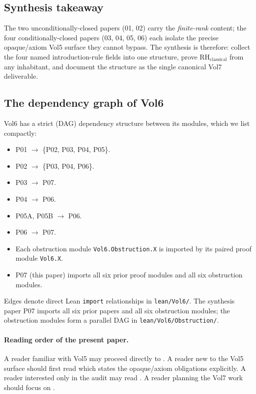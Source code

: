 \documentclass[11pt]{article}
\theoremstyle{plain}
\theoremstyle{definition}
\theoremstyle{remark}
\newcommand{\code}[1]{\texttt{#1}}
\newcommand{\RH}{\mathrm{RH}_{\mathrm{classical}}}
\begin{document}
\subsection{Synthesis takeaway}

The two unconditionally-closed papers (01, 02) carry the
\emph{finite-rank} content; the four conditionally-closed papers
(03, 04, 05, 06) each isolate the precise opaque/axiom Vol5 surface
they cannot bypass.  The synthesis is therefore: collect the four
named introduction-rule fields into one structure, prove
\(\RH\) from any inhabitant, and document the structure as the
single canonical Vol7 deliverable.

\subsection{The dependency graph of Vol6}

Vol6 has a strict (DAG) dependency structure between its modules,
which we list compactly:
\begin{itemize}[leftmargin=2em]
  \item P01 \(\to\) \{P02, P03, P04, P05\}.
  \item P02 \(\to\) \{P03, P04, P06\}.
  \item P03 \(\to\) P07.
  \item P04 \(\to\) P06.
  \item P05A, P05B \(\to\) P06.
  \item P06 \(\to\) P07.
  \item Each obstruction module
        \texttt{Vol6.Obstruction.X} is imported by its paired
        proof module \texttt{Vol6.X}.
  \item P07 (this paper) imports all six prior proof modules
        and all six obstruction modules.
\end{itemize}
Edges denote direct Lean \code{import} relationships in
\code{lean/Vol6/}.  The synthesis paper P07 imports all six prior
papers and all six obstruction modules; the obstruction modules form
a parallel DAG in \code{lean/Vol6/Obstruction/}.

\paragraph{Reading order of the present paper.}
A reader familiar with Vol5 may proceed directly to
.  A reader new to the Vol5 surface
should first read  which states the
opaque/axiom obligations explicitly.  A reader interested only in
the audit may read .  A reader planning the Vol7
work should focus on .
\end{document}
